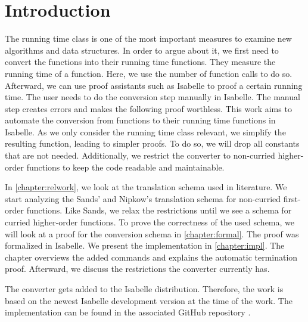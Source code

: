 \chapter{Introduction}\label{chapter:introduction}

The running time class is one of the most important measures to examine new algorithms and data structures.
In order to argue about it, we first need to convert the functions into their running time functions.
They measure the running time of a function.
Here, we use the number of function calls to do so.
Afterward, we can use proof assistants such as Isabelle to proof a certain running time.
The user needs to do the conversion step manually in Isabelle.
The manual step creates errors and makes the following proof worthless.
This work aims to automate the conversion from functions to their running time functions in Isabelle.
As we only consider the running time class relevant, we simplify the resulting function, leading to simpler proofs.
To do so, we will drop all constants that are not needed.
Additionally, we restrict the converter to non-curried higher-order functions to keep the code readable and maintainable.

In \autoref{chapter:relwork}, we look at the translation schema used in literature.
We start analyzing the Sands' \parencite{sands} and Nipkow's \parencite{fds} translation schema for non-curried first-order functions.
Like Sands, we relax the restrictions until we see a schema for curried higher-order functions.
To prove the correctness of the used schema, we will look at a proof for the conversion schema in \autoref{chapter:formal}.
The proof was formalized in Isabelle.
We present the implementation in \autoref{chapter:impl}.
The chapter overviews the added commands and explains the automatic termination proof.
Afterward, we discuss the restrictions the converter currently has.

The converter gets added to the Isabelle distribution.
Therefore, the work is based on the newest Isabelle development version at the time of the work.
The implementation can be found in the associated GitHub repository \cite{repo}.
